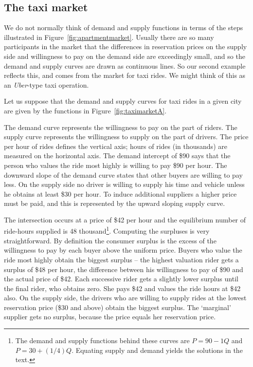 \newhtmlpage

\subsection*{The taxi market}

We do not normally think of demand and supply functions in terms of the
steps illustrated in Figure~\ref{fig:apartmentmarket}. Usually there are so
many participants in the market that the differences in reservation prices
on the supply side and willingness to pay on the demand side are exceedingly
small, and so the demand and supply curves are drawn as continuous lines. So
our second example reflects this, and comes from the market for taxi rides.
We might think of this as an \textit{Uber}-type taxi operation. 

Let us suppose that the demand and supply curves for taxi rides in a given
city are given by the functions in Figure~\ref{fig:taximarketA}. 


\newhtmlpage



The demand curve represents
the willingness to pay on the part of riders. The supply curve represents
the willingness to supply on the part of drivers. The price per hour of
rides defines the vertical axis; hours of rides (in thousands) are measured on the
horizontal axis. The demand intercept of \$90 says that the person who
values the ride most highly is willing to pay \$90 per hour. The downward
slope of the demand curve states that other buyers are willing to pay less.
On the supply side no driver is willing to supply his time and vehicle
unless he obtains at least \$30 per hour. To induce additional suppliers a
higher price must be paid, and this is represented by the upward sloping
supply curve. 

The intersection occurs at a price of \$42 per hour and the equilibrium
number of ride-hours supplied is 48 thousand\footnote{%
The demand and supply functions behind these curves are $P=90-1Q$ and $%
P=30+(1/4)Q$. Equating supply and demand yields the solutions in the text.}.
Computing the surpluses is very straightforward. By definition the consumer
surplus is the excess of the willingness to pay by each buyer above the
uniform price. Buyers who value the ride most highly obtain the biggest
surplus -- the highest valuation rider gets a surplus of \$48 per hour, the
difference between his willingness to pay of \$90 and the actual price of 
\$42. Each successive rider gets a slightly lower surplus until the final
rider, who obtains zero. She pays \$42 and values the ride hours at \$42
also. On the supply side, the drivers who are willing to supply rides at the
lowest reservation price (\$30 and above) obtain the biggest surplus. The
`marginal' supplier gets no surplus, because the price equals her
reservation price.


